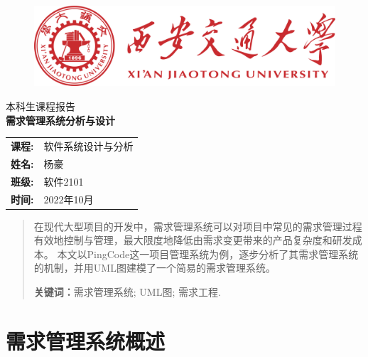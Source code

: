 \documentclass[12pt, a4paper, oneside]{ctexart}
\begin{document}
\thispagestyle{empty}

\begin{figure}[t]
    \centering
    \includegraphics[width=13cm]{../pic/xjtu.png}
\end{figure}

\vspace*{\fill}
    \begin{center}
        \centering
        \vspace{-3cm}
        \fangsong\huge{本科生课程报告} \\\kaishu \Huge{\textbf{需求管理系统分析与设计}}
    \end{center}
\vspace*{\fill}

\begin{table}[b]
    \centering
    \large
    \begin{tabular}{ll}
        \textbf{课程:} & 软件系统设计与分析 \\
        \textbf{姓名:} & 杨豪 \\
        \textbf{班级:} & 软件2101 \\
        \textbf{时间:} & 2022年10月 \\
    \end{tabular}
\end{table}

\newpage

\thispagestyle{empty}
\begin{abstract}
    在现代大型项目的开发中，需求管理系统可以对项目中常见的需求管理过程有效地控制与管理，最大限度地降低由需求变更带来的产品复杂度和研发成本。
    本文以PingCode这一项目管理系统为例，逐步分析了其需求管理系统的机制，并用UML图建模了一个简易的需求管理系统。
    \par\textbf{关键词：}需求管理系统; UML图; 需求工程. 
\end{abstract}

\newpage
{}
\setcounter{page}{1}
\thispagestyle{plain}
\tableofcontents
\newpage
\setcounter{page}{1}

\section{需求管理系统概述}
\end{document}
